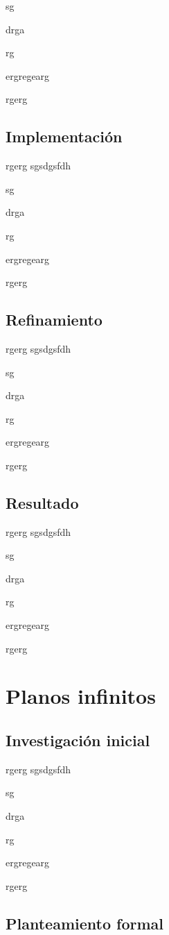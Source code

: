 sg

drga

rg

ergregearg

rgerg

\subsection{Implementación}

rgerg
sgsdgsfdh

sg

drga

rg

ergregearg

rgerg

\subsection{Refinamiento}

rgerg
sgsdgsfdh

sg

drga

rg

ergregearg

rgerg

\subsection{Resultado}

rgerg
sgsdgsfdh

sg

drga

rg

ergregearg

rgerg


\section{Planos infinitos}

\subsection{Investigación inicial}

rgerg
sgsdgsfdh

sg

drga

rg

ergregearg

rgerg

\subsection{Planteamiento formal}

